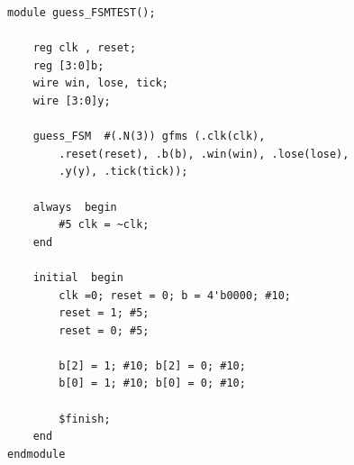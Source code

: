 \documentclass[11pt]{article}
\begin{document}
\begin{lstlisting}[style=Verilog,
caption=guessFSM Test,
label=MUX2 Test
]
module guess_FSMTEST();
	
	reg clk , reset;
	reg [3:0]b;
	wire win, lose, tick;
	wire [3:0]y;
	
	guess_FSM  #(.N(3)) gfms (.clk(clk),
		.reset(reset), .b(b), .win(win), .lose(lose),
		.y(y), .tick(tick));
	
	always  begin
		#5 clk = ~clk;
	end
	
	initial  begin
		clk =0; reset = 0; b = 4'b0000; #10;
		reset = 1; #5;
		reset = 0; #5;
	
		b[2] = 1; #10; b[2] = 0; #10;
		b[0] = 1; #10; b[0] = 0; #10;
	
		$finish;
	end
endmodule  
	
\end{lstlisting}
\end{document}
